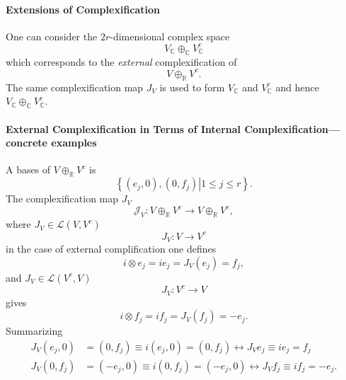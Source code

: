 \documentclass[aps,preprint]{revtex4}
\begin{document}
\paragraph{Extensions of Complexification}

One can consider the $2r$-dimensional complex space 
\begin{equation}
V_{\mathbb{C}}\oplus_{\mathbb{C}}V_{\mathbb{C}}^{c}
\end{equation}
which corresponds to the \emph{external} complexification of 
\begin{equation}
V\oplus_{\mathbb{R}}V^{c}.
\end{equation}
The same complexification map $J_{V}$ is used to form $V_{\mathbb{C}}$ and $%
V_{\mathbb{C}}^{c}$ and hence $V_{\mathbb{C}}\oplus_{\mathbb{C}}V_{\mathbb{C}%
}^{c}.$

\paragraph{External Complexification in Terms of Internal
Complexification---concrete examples}

A bases of $V\oplus_{\mathbb{R}}V^{c}$ is%
\begin{equation}
\left\{ \left. \left( e_{j},0\right) ,\left( 0,f_{j}\right) \right\vert
1\leq j\leq r\right\} .
\end{equation}
The complexification map $J_{V}$ 
\begin{equation}
\mathcal{J}_{V}:V\oplus_{\mathbb{R}}V^{c}\rightarrow V\oplus_{\mathbb{R}%
}V^{c},
\end{equation}
where $J_{V}\in\mathcal{L}\left( V,V^{c}\right) $ 
\begin{equation}
J_{V}:V\rightarrow V^{c}
\end{equation}
in the case of external complification one defines 
\begin{equation}
i\otimes e_{j}=ie_{j}=J_{V}\left( e_{j}\right) =f_{j},
\end{equation}
and $J_{V}\in\mathcal{L}\left( V^{c},V\right) $ 
\begin{equation}
J_{V}:V^{c}\rightarrow V
\end{equation}
gives%
\begin{equation}
i\otimes f_{j}=if_{j}=J_{V}\left( f_{j}\right) =-e_{j}.
\end{equation}
Summarizing 
\begin{align}
J_{V}\left( e_{j},0\right) & =\left( 0,f_{j}\right) \equiv i\left(
e_{j},0\right) =\left( 0,f_{j}\right) \leftrightarrow J_{V}e_{j}\equiv
ie_{j}=f_{j} \\
J_{V}\left( 0,f_{j}\right) & =\left( -e_{j},0\right) \equiv i\left(
0,f_{j}\right) =\left( -e_{j},0\right) \leftrightarrow J_{V}f_{j}\equiv
if_{j}=-e_{j}.
\end{align}
\end{document}
